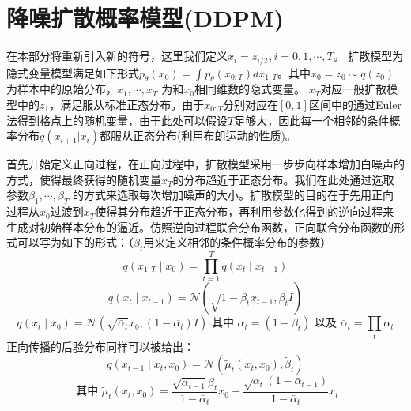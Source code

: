\section{降噪扩散概率模型(DDPM)}
在本部分将重新引入新的符号，这里我们定义$x_i= z_{i/T},i=0,1,\cdots,T$。
扩散模型为隐式变量模型满足如下形式$p_{\theta}(x_0) = \int p_{\theta}(x_{0:T}) dx_{1:T}$。其中$x_0=z_0\sim q(z_0)$为样本中的原始分布，$x_1,\cdots, x_{T}$ 为和$x_0$相同维数的隐式变量。 $x_T$对应一般扩散模型中的$z_1$，满足服从标准正态分布。由于$x_{0:T}$分别对应在$[0,1]$区间中的通过Euler法得到格点上的随机变量，由于此处可以假设$T$足够大，因此每一个相邻的条件概率分布$q(x_{i+1}|x_i)$都服从正态分布(利用布朗运动的性质)。\par 
首先开始定义正向过程，在正向过程中，扩散模型采用一步步向样本增加白噪声的方式，使得最终获得的随机变量$x_T$的分布趋近于正态分布。我们在此处通过选取参数$\beta_1, \cdots, \beta_{T}$ 的方式来选取每次增加噪声的大小。扩散模型的目的在于先用正向过程从$x_0$过渡到$x_T$使得其分布趋近于正态分布，再利用参数化得到的逆向过程来生成对初始样本分布的逼近。仿照逆向过程联合分布函数，正向联合分布函数的形式可以写为如下的形式：（$\beta_t$用来定义相邻的条件概率分布的参数）
\begin{equation}
    q\left(x_{1: T} \mid x_0\right)=\prod_{t=1}^T q\left(x_t \mid x_{t-1}\right)
    \end{equation}
    \begin{equation}
        q\left(x_t \mid x_{t-1}\right)=\mathcal{N}\left(\sqrt{1-\beta_t} x_{t-1}, \beta_t I\right)
        \end{equation}
        \begin{equation}
            q\left(x_t \mid x_0\right)=\mathcal{N}\left(\sqrt{\bar{\alpha}_t} x_0,\left(1-\overline{\alpha_t}\right) I\right) \text { 其中 } \alpha_t=\left(1-\beta_t\right) \text { 以及 } \bar{\alpha}_t=\prod_t \alpha_t
            \label{posterior of xt}
            \end{equation}
    正向传播的后验分布同样可以被给出：
    \begin{equation}
        q\left(x_{t-1} \mid x_t, x_0\right)=\mathcal{N}\left(\tilde{\mu}_t\left(x_t, x_0\right), \tilde{\beta}_t\right)
        \label{posterior xt 2}
        \end{equation}
        \begin{equation}
            \text {     其中 } \tilde{\mu}_t\left(x_t, x_0\right)=\frac{\sqrt{\bar{\alpha}_{t-1}} \beta_t}{1-\bar{\alpha}_t} x_0+\frac{\sqrt{\alpha_t}\left(1-\bar{\alpha}_{t-1}\right)}{1-\bar{\alpha}_t} x_t
            \end{equation}
